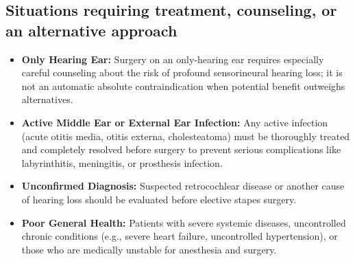 \subsection*{Situations requiring treatment, counseling, or an alternative approach}
\begin{itemize}
  \item \textbf{Only Hearing Ear:} Surgery on an only-hearing ear requires especially careful counseling about the risk of profound sensorineural hearing loss; it is not an automatic absolute contraindication when potential benefit outweighs alternatives.
  
  \item \textbf{Active Middle Ear or External Ear Infection:} Any active infection (acute otitis media, otitis externa, cholesteatoma) must be thoroughly treated and completely resolved before surgery to prevent serious complications like labyrinthitis, meningitis, or prosthesis infection.
  
  \item \textbf{Unconfirmed Diagnosis:} Suspected retrocochlear disease or another cause of hearing loss should be evaluated before elective stapes surgery.
  
  \item \textbf{Poor General Health:} Patients with severe systemic diseases, uncontrolled chronic conditions (e.g., severe heart failure, uncontrolled hypertension), or those who are medically unstable for anesthesia and surgery.
\end{itemize}

